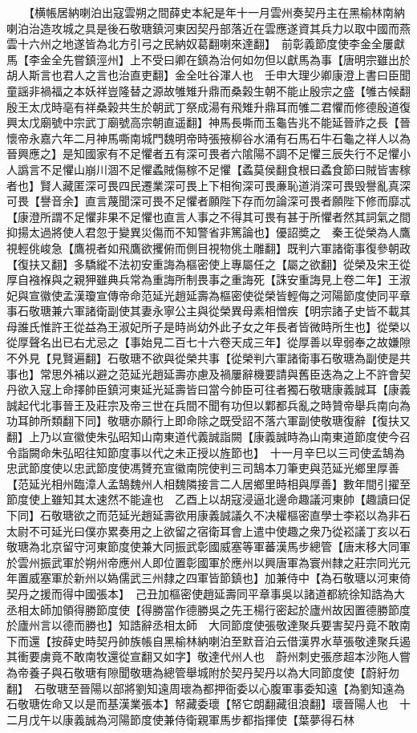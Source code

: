 　　【横帳居納喇泊出寇雲朔之間薛史本紀是年十一月雲州奏契丹主在黑榆林南納喇泊治造攻城之具是後石敬瑭鎮河東因契丹部落近在雲應遂資其兵力以取中國而燕雲十六州之地遂皆為北方引弓之民納奴葛翻喇來達翻】　前彰義節度使李金全屢獻馬【李金全先嘗鎮涇州】上不受曰卿在鎮為治何如勿但以獻馬為事【唐明宗雖出於胡人斯言也君人之言也治直吏翻】金全吐谷渾人也　壬申大理少卿康澄上書曰臣聞童謡非禍福之本妖祥豈隆替之源故雊雉升鼎而桑榖生朝不能止殷宗之盛【雊古候翻殷王太戊時亳有祥桑榖共生於朝武丁祭成湯有飛雉升鼎耳而雊二君懼而修德殷道復興太戊廟號中宗武丁廟號高宗朝直遥翻】神馬長嘶而玉龜告兆不能延晉祚之長【晉懷帝永嘉六年二月神馬嘶南城門魏明帝時張掖柳谷水涌有石馬石牛石龜之祥人以為晉興應之】是知國家有不足懼者五有深可畏者六隂陽不調不足懼三辰失行不足懼小人譌言不足懼山崩川涸不足懼蟊賊傷稼不足懼【蟊莫侯翻食根曰蟊食節曰賊皆害稼者也】賢人藏匿深可畏四民遷業深可畏上下相徇深可畏亷恥道消深可畏毁譽亂真深可畏【譽音余】直言蔑聞深可畏不足懼者願陛下存而勿論深可畏者願陛下修而靡忒【康澄所謂不足懼非果不足懼也直言人事之不得其可畏有甚于所懼者然其詞氣之間抑揚太過將使人君忽于變異災傷而不知警省非篤論也】優詔奬之　秦王從榮為人鷹視輕佻峻急【鷹視者如飛鷹欲攫俯而側目視物佻土雕翻】既判六軍諸衛事復參朝政【復扶又翻】多驕縱不法初安重誨為樞密使上專屬任之【屬之欲翻】從榮及宋王從厚自襁褓與之親狎雖典兵常為重誨所制畏事之重誨死【誅安重誨見上卷二年】王淑妃與宣徽使孟漢瓊宣傳帝命范延光趙延壽為樞密使從榮皆輕侮之河陽節度使同平章事石敬瑭兼六軍諸衛副使其妻永寧公主與從榮異母素相憎疾【明宗諸子史皆不載其母誰氏惟許王從益為王淑妃所子是時尚幼外此子女之年長者皆微時所生也】從榮以從厚聲名出已右尤忌之【事始見二百七十六卷天成三年】從厚善以卑弱奉之故嫌隙不外見【見賢遍翻】石敬瑭不欲與從榮共事【從榮判六軍諸衛事石敬瑭為副使是共事也】常思外補以避之范延光趙延壽亦慮及禍屢辭機要請與舊臣迭為之上不許會契丹欲入寇上命擇帥臣鎮河東延光延壽皆曰當今帥臣可往者獨石敬瑭康義誠耳【康義誠起代北事晉王及莊宗及帝三世在兵間不聞有功但以鄴都兵亂之時贊帝舉兵南向為功耳帥所類翻下同】敬瑭亦願行上即命除之既受詔不落六軍副使敬瑭復辭【復扶又翻】上乃以宣徽使朱弘昭知山南東道代義誠詣闕【康義誠時為山南東道節度使今召令詣闕命朱弘昭往知節度事以代之未正授以旌節也】　十一月辛巳以三司使孟鵠為忠武節度使以忠武節度使馮贇充宣徽南院使判三司鵠本刀筆吏與范延光鄉里厚善【范延光相州臨漳人孟鵠魏州人相魏隣接言二人居鄉里時相與厚善】數年間引擢至節度使上雖知其太速然不能違也　乙酉上以胡寇浸逼北邊命趣議河東帥【趣讀曰促下同】石敬瑭欲之而范延光趙延壽欲用康義誠議久不决權樞密直學士李崧以為非石太尉不可延光曰僕亦累奏用之上欲留之宿衛耳會上遣中使趣之衆乃從崧議丁亥以石敬瑭為北京留守河東節度使兼大同振武彰國威塞等軍蕃漢馬步總管【唐末移大同軍於雲州振武軍於朔州帝應州人即位置彰國軍於應州以興唐軍為寰州隸之莊宗同光元年置威塞軍於新州以媯儒武三州隸之四軍皆節鎮也】加兼侍中【為石敬瑭以河東倚契丹之援而得中國張本】　己丑加樞密使趙延壽同平章事吳以諸道都統徐知誥為大丞相太師加領得勝節度使【得勝當作德勝吳之先王楊行密起於廬州故因置德勝節度於廬州言以德而勝也】知誥辭丞相太師　大同節度使張敬達聚兵要害契丹竟不敢南下而還【按薛史時契丹帥族帳自黑榆林納喇泊至默音泊云借漢界水草張敬達聚兵遏其衝要虜竟不敢南牧還從宣翻又如字】敬達代州人也　蔚州刺史張彦超本沙陁人嘗為帝養子與石敬瑭有隙聞敬瑭為總管舉城附於契丹契丹以為大同節度使【蔚紆勿翻】　石敬瑭至晉陽以部將劉知遠周瓌為都押衙委以心腹軍事委知遠【為劉知遠為石敬瑭佐命又以是而基漢業張本】帑藏委瓌【帑它朗翻藏徂浪翻】瓌晉陽人也　十二月戊午以康義誠為河陽節度使兼侍衛親軍馬步都指揮使【葉夢得石林